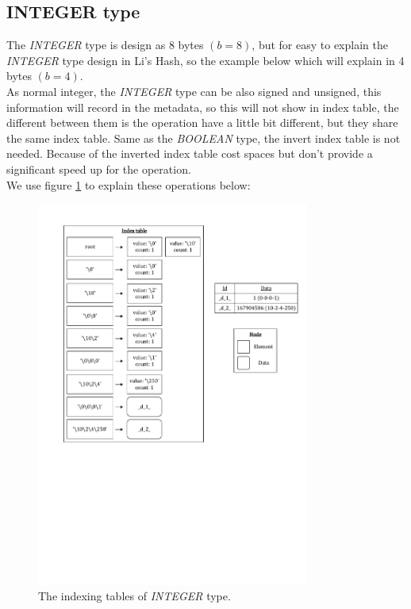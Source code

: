 \subsection{INTEGER type}

The \textit{INTEGER} type is design as 8 bytes $({b} = 8)$, but for easy to explain the \textit{INTEGER} type design in Li's Hash, so the example below which will explain in 4 bytes $(b = 4)$.\\

As normal integer, the \textit{INTEGER} type can be also signed and unsigned, this information will record in the metadata, so this will not show in index table, the different between them is the operation have a little bit different, but they share the same index table. Same as the \textit{BOOLEAN} type, the invert index table is not needed. Because of the inverted index table cost spaces but don't provide a significant speed up for the operation.\\

We use figure \ref{fig:algorithm:integer:example_1} to explain these operations below:

\begin{figure}[h]
\centering
\includegraphics[width=0.8\textwidth]{./algorithm/integer/pic/example_1_v3.pdf}
\caption{The indexing tables of \textit{INTEGER} type.}
\label{fig:algorithm:integer:example_1}
\end{figure}

